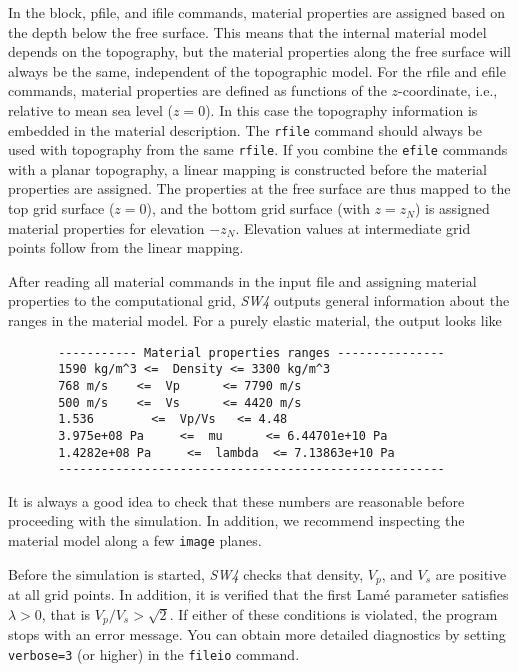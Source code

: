 \documentclass[11pt]{report}
\begin{document}
In the block, pfile, and ifile commands, material properties are assigned based on the depth below
the free surface. This means that the internal material model depends on the topography, but the
material properties along the free surface will always be the same, independent of the topographic
model. For the rfile and efile commands, material properties are defined as functions of the
$z$-coordinate, i.e., relative to mean sea level ($z=0$). In this case the topography information is
embedded in the material description. The {\tt rfile} command should always be used with topography
from the same {\tt rfile}. If you combine the {\tt efile} commands with a planar topography, a
linear mapping is constructed before the material properties are assigned. The properties at the
free surface are thus mapped to the top grid surface ($z=0$), and the bottom grid surface (with
$z=z_N$) is assigned material properties for elevation $-z_N$. Elevation values at intermediate grid
points follow from the linear mapping.

After reading all material commands in the input file and assigning material properties to the
computational grid, \emph{SW4} outputs general information about the ranges in the material
model. For a purely elastic material, the output looks like
\begin{verbatim}
       ----------- Material properties ranges ---------------
       1590 kg/m^3 <=  Density <= 3300 kg/m^3
       768 m/s    <=  Vp      <= 7790 m/s
       500 m/s    <=  Vs      <= 4420 m/s
       1.536        <=  Vp/Vs   <= 4.48
       3.975e+08 Pa     <=  mu      <= 6.44701e+10 Pa
       1.4282e+08 Pa     <=  lambda  <= 7.13863e+10 Pa
       ------------------------------------------------------
\end{verbatim}
It is always a good idea to check that these numbers are reasonable before proceeding with the
simulation. In addition, we recommend inspecting the material model along a few \verb+image+ planes.

Before the simulation is started, \emph{SW4} checks that density, $V_p$, and $V_s$ are
positive at all grid points. In addition, it is verified that the first Lam\'e parameter satisfies
$\lambda>0$, that is $V_p/V_s > \sqrt{2}$. If either of these conditions is violated, the program
stops with an error message. You can obtain more detailed diagnostics by setting \verb+verbose=3+
(or higher) in the \verb+fileio+ command.
\end{document}
